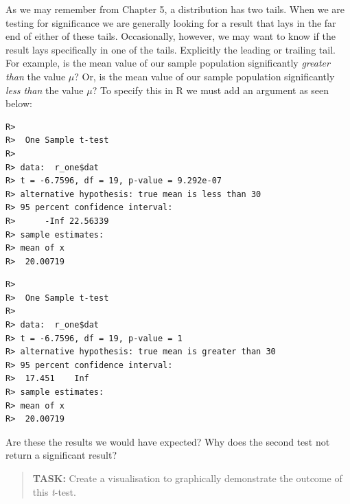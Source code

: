 \documentclass[english,10pt,a4paper,oneside]{book}
\newenvironment{Shaded}{\begin{snugshade}}{\end{snugshade}}
\newcommand{\CommentTok}[1]{\textcolor[rgb]{0.56,0.35,0.01}{\textit{#1}}}
\newcommand{\DataTypeTok}[1]{\textcolor[rgb]{0.13,0.29,0.53}{#1}}
\newcommand{\DecValTok}[1]{\textcolor[rgb]{0.00,0.00,0.81}{#1}}
\newcommand{\KeywordTok}[1]{\textcolor[rgb]{0.13,0.29,0.53}{\textbf{#1}}}
\newcommand{\NormalTok}[1]{#1}
\newcommand{\OperatorTok}[1]{\textcolor[rgb]{0.81,0.36,0.00}{\textbf{#1}}}
\newcommand{\StringTok}[1]{\textcolor[rgb]{0.31,0.60,0.02}{#1}}
\theoremstyle{definition}
\theoremstyle{definition}
\theoremstyle{definition}
\theoremstyle{remark}
\begin{document}
As we may remember from Chapter 5, a distribution has two tails. When we
are testing for significance we are generally looking for a result that
lays in the far end of either of these tails. Occasionally, however, we
may want to know if the result lays specifically in one of the tails.
Explicitly the leading or trailing tail. For example, is the mean value
of our sample population significantly \emph{greater than} the value
\(\mu\)? Or, is the mean value of our sample population significantly
\emph{less than} the value \(\mu\)? To specify this in R we must add an
argument as seen below:

\begin{Shaded}
\end{Shaded}

\begin{verbatim}
R> 
R>  One Sample t-test
R> 
R> data:  r_one$dat
R> t = -6.7596, df = 19, p-value = 9.292e-07
R> alternative hypothesis: true mean is less than 30
R> 95 percent confidence interval:
R>      -Inf 22.56339
R> sample estimates:
R> mean of x 
R>  20.00719
\end{verbatim}

\begin{Shaded}
\end{Shaded}

\begin{verbatim}
R> 
R>  One Sample t-test
R> 
R> data:  r_one$dat
R> t = -6.7596, df = 19, p-value = 1
R> alternative hypothesis: true mean is greater than 30
R> 95 percent confidence interval:
R>  17.451    Inf
R> sample estimates:
R> mean of x 
R>  20.00719
\end{verbatim}

Are these the results we would have expected? Why does the second test
not return a significant result?

\begin{quote}
\textbf{TASK:} Create a visualisation to graphically demonstrate the
outcome of this \emph{t}-test.
\end{quote}
\end{document}
